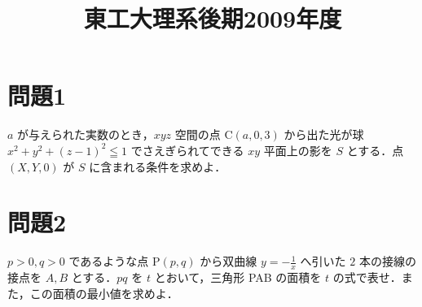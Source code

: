 \documentclass[unicode,12pt, a4paper]{ltjsarticle}%
\title{東工大理系後期2009年度}
\begin{document}
\maketitle
\section{問題1}
$a$ が与えられた実数のとき，$xyz$ 空間の点 C$(a,0,3)$ から出た光が球 $x^2+y^2+(z-1)^2 \leqq 1$ でさえぎられてできる $xy$ 平面上の影を $S$ とする．点 $(X,Y,0)$ が $S$ に含まれる条件を求めよ．


\section{問題2}
$p>0, q>0$ であるような点 P$(p,q)$ から双曲線 $y = -\frac{1}{x}$ へ引いた $2$ 本の接線の接点を $A, B$ とする．$pq$ を $t$ とおいて，三角形 PAB の面積を $t$ の式で表せ．また，この面積の最小値を求めよ．
\end{document}
